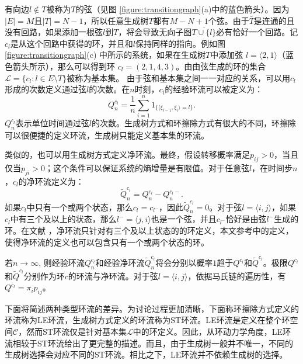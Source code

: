 有向边$l \notin T$被称为$T$的弦（见图 \ref{figure:transitiongraph}(a)中的蓝色箭头）。因为$|E|=M$且$|T|= N-1$，所以任意生成树$T$都有$M-N+1$个弦。由于$\bar{T}$是连通的且没有回路，如果添加一根弦$l$到$T$，将会导致无向子图$\overline{T \cup \{l\}}$必有恰好一个回路。记$c_l$是从这个回路中获得的环，并且和$l$保持同样的指向。例如图 \ref{figure:transitiongraph}(c) 中所示的系统，如果在生成树$T$中添加弦 $l=\langle 2,1 \rangle$（蓝色箭头所示），那么可以得到环 $c_l=(2,1,4,3)$。由由弦生成的环的集合$\mathcal{L} = \{c_l: l\in E\setminus T\}$被称为基本集。
由于弦和基本集之间一一对应的关系，可以用$c_l$形成的次数定义通过弦$l$的次数。在$n$时刻，$c_l$的经验环流可以被定义为：
\begin{equation*}
    Q^{c_l}_n = \frac{1}{n}\sum_{i=1}^n1_{\{\langle\xi_{i-1},\xi_i\rangle=l\}}.
\end{equation*}
$Q^{c_l}_n$表示单位时间通过弦$l$的次数。生成树方式和环擦除方式有很大的不同，环擦除可以很便捷的定义环流，生成树只能定义基本集的环流。

类似的，也可以用生成树方式定义净环流。最终，假设转移概率满足$p_{ij}>0$，当且仅当$p_{ji}>0$；这个条件可以保证系统的熵增量是有限值\cite{Schnakenberg1976NetworkTO,jiang2004mathematical}。对于任意弦$l$，在时间步$n$，$c_l$的净环流定义为：
\begin{equation*}
    \tilde{Q}^{c_l}_n=Q^{c_l}_n-Q^{c_l-}_n.
\end{equation*}
如果$c_l$中只有一个或两个状态，那么$c_l = c_{l^-}$，因此$\tilde{Q}_n^{c_l}=0$。对于弦$l=\langle i,j \rangle$，如果$c_l$中有三个及以上的状态，那么$l^-=\langle j,i\rangle$也是一个弦，并且$c_{l^-}$恰好是由弦$l^-$生成的环。在文献 \cite{Schnakenberg1976NetworkTO, andrieux2007fluctuation, andrieux2007network}，净环流只针对有三个及以上状态的的环定义，本文参考\cite{kalpazidou2007cycle}中的定义，使得净环流的定义也可以包含只有一个或两个状态的环。

若$n \to \infty$, 则经验环流$Q_n^{c_l}$和经验净环流$\tilde{Q}_n^{c_l}$将会分别以概率$1$趋于$Q^{c_l}$和$\tilde{Q}^{c_l}$。极限$Q^{c_l}$和$\tilde{Q}^{c_l}$分别作为环$c$的环流与净环流。对于弦$l=\langle i,j \rangle$，依据马氏链的遍历性，有$Q^{c_l} = \pi_i p_{ij}$。

下面将简述两种类型环流的差异。为讨论过程更加清晰，下面称环擦除方式定义的环流称为LE环流，生成树方式定义的环流称为ST环流。LE环流是定义在整个环空间$\mathcal{C}$，然而ST环流仅是针对基本集$\mathcal{L}$中的环定义。因此，从环动力学角度，LE环流相较于ST环流给出了更完整的描述。而且，由于生成树一般并不唯一，不同的生成树选择会对应不同的ST环流。相比之下，LE环流并不依赖生成树的选择。

